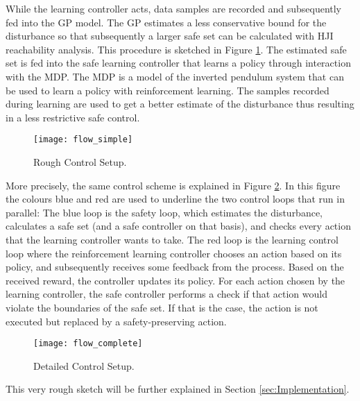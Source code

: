 \documentclass[../main.tex]{subfiles}
\begin{document}
While the learning controller acts, data samples are recorded and subsequently fed into the GP model. The GP estimates a less conservative bound for the disturbance so that subsequently a larger safe set can be calculated with HJI reachability analysis. This procedure is sketched in Figure \ref{fig:flow_simple}. The estimated safe set is fed into the safe learning controller that learns a policy through interaction with the MDP. The MDP is a model of the inverted pendulum system that can be used to learn a policy with reinforcement learning. The samples recorded during learning are used to get a better estimate of the disturbance thus resulting in a less restrictive safe control.\par
\begin{figure}
    \centering
    \texttt{[image: flow\_simple]}
    \caption{Rough Control Setup.}
    \label{fig:flow_simple}
\end{figure}
More precisely, the same control scheme is explained in Figure \ref{fig:flow_complete}. In this figure the colours blue and red are used to underline the two control loops that run in parallel: The blue loop is the safety loop, which estimates the disturbance, calculates a safe set (and a safe controller on that basis), and checks every action that the learning controller wants to take. The red loop is the learning control loop where the reinforcement learning controller chooses an action based on its policy, and subsequently receives some feedback from the process. Based on the received reward, the controller updates its policy. For each action chosen by the learning controller, the safe controller performs a check if that action would violate the boundaries of the safe set. If that is the case, the action is not executed but replaced by a safety-preserving action.
\begin{figure}
    \centering
    \texttt{[image: flow\_complete]}
    \caption{Detailed Control Setup.}
    \label{fig:flow_complete}
\end{figure}
This very rough sketch will be further explained in Section \ref{sec:Implementation}.
\end{document}

